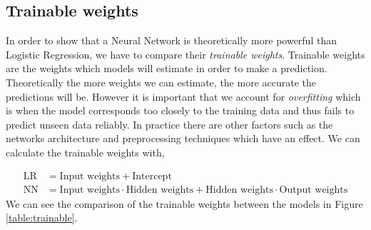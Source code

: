 \subsection{Trainable weights}
In order to show that a Neural Network is theoretically more powerful than Logistic Regression, we have to compare their \emph{trainable weights}. Trainable weights are the weights which models will estimate in order to make a prediction. Theoretically the more weights we can estimate, the more accurate the predictions will be. However it is important that we account for \emph{overfitting} which is when the model corresponds too closely to the training data and thus fails to predict unseen data reliably. In practice there are other factors such as the networks architecture and preprocessing techniques which have an effect. We can calculate the trainable weights with,

\begin{equation*}
\begin{split}
    \mbox{LR} &= \mbox{Input weights} + \mbox{Intercept}
    \\
    \mbox{NN} &= \mbox{Input weights} \cdot \mbox{Hidden weights} + \mbox{Hidden weights} \cdot \mbox{Output weights}
    \end{split}
\end{equation*}
We can see the comparison of the trainable weights between the models in Figure \ref{table:trainable}.
 \begin{table}[h!]
 \footnotesize
\begin{center}
\par\end{center}
\caption{Trainable Weights}\label{table:trainable}
\end{table}
